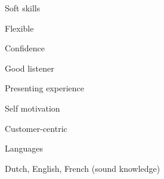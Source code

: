 \begin{cvskills}
  \cvskill
    {Soft skills} %
    {
      \begin{cvitems} %
        \item {Flexible} %
        \item {Confidence} %
        \item {Good listener} %
        \item {Presenting experience} %
        \item {Self motivation} %
        \item {Customer-centric} %
      \end{cvitems}
    }

  \cvskill
    {Languages} %
    {
      \begin{cvitems} %
        \item {Dutch, English, French (sound knowledge)} %
      \end{cvitems}
    }

\end{cvskills}
